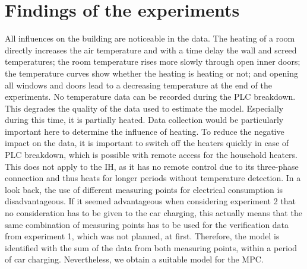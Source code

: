 \section{Findings of the experiments}
\label{sec:findings of the experiments}
All influences on the building are noticeable in the data. The heating of a room directly increases the air temperature and with a time delay the wall and screed temperatures; the room temperature rises more slowly through open inner doors; the temperature curves show whether the heating is heating or not; and opening all windows and doors lead to a decreasing temperature at the end of the experiments. \newline
No temperature data can be recorded during the PLC breakdown. This degrades the quality of the data used to estimate the model. Especially during this time, it is partially heated. Data collection would be particularly important here to determine the influence of heating. To reduce the negative impact on the data, it is important to switch off the heaters quickly in case of PLC breakdown, which is possible with remote access for the household heaters. This does not apply to the IH, as it has no remote control due to its three-phase connection and thus heats for longer periods without temperature detection.\newline
In a look back, the use of different measuring points for electrical consumption is disadvantageous. If it seemed advantageous when considering experiment 2 that no consideration has to be given to the car charging, this actually means that the same combination of measuring points has to be used for the verification data from experiment 1, which was not planned, at first. Therefore, the model is identified with the sum of the data from both measuring points, within a period of car charging. Nevertheless, we obtain a suitable model for the MPC.

